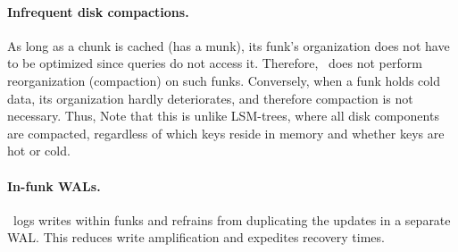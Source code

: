 \paragraph{Infrequent disk compactions.} 
As long as a chunk is cached (has a munk), its funk's organization does not have to be optimized since 
queries do not access it. Therefore, \sys\ does not perform reorganization (compaction) on such funks.
Conversely, when a funk holds cold data, its organization hardly deteriorates, and therefore compaction is not necessary.
Thus,  
Note that this is unlike LSM-trees, where all disk components are compacted, regardless of which keys reside in memory and whether 
keys are hot or cold. 

\paragraph{In-funk WALs.} \sys\ logs writes within funks and refrains from duplicating the updates  in a separate WAL. This reduces write amplification and expedites recovery times. 
